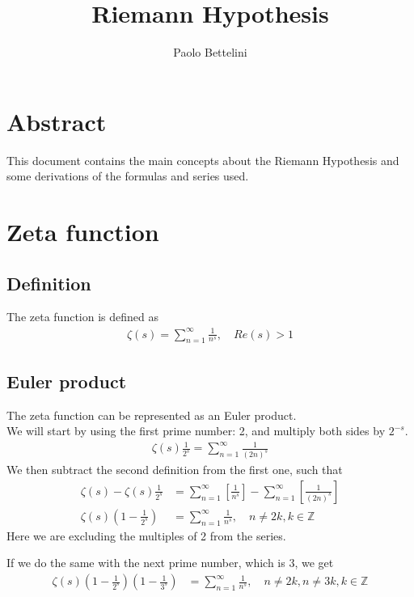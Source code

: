 \documentclass{article}
\title{Riemann Hypothesis}
\author{Paolo Bettelini}
\date{}
\begin{document}
\maketitle

\section*{Abstract}
This document contains the main concepts about the
Riemann Hypothesis and some derivations of the formulas and series used.

\pagebreak

\tableofcontents
\pagebreak

\section{Zeta function}

\subsection{Definition}
The zeta function is defined as
\begin{align*}
    \zeta(s)=\sum_{n=1}^{\infty}\frac{1}{n^s},\quad Re(s)>1
\end{align*}

\subsection{Euler product}
The zeta function can be represented as an Euler product.
\\
We will start by using the first prime number: 2, and multiply both sides by \(2^{-s}\).
\begin{align*}
    \zeta(s)\frac{1}{2^s}=\sum_{n=1}^{\infty}\frac{1}{{(2n)}^s}
\end{align*}
We then subtract the second definition from the first one, such that
\begin{align*}
    \zeta(s)-\zeta(s)\frac{1}{2^s}&=
    \sum_{n=1}^{\infty}\left[\frac{1}{n^s}\right]-
    \sum_{n=1}^{\infty}\left[\frac{1}{{(2n)}^s}\right]
    \\
    \zeta(s)\left(1-\frac{1}{2^s}\right)&=
    \sum_{n=1}^{\infty}\frac{1}{n^s},
    \quad n\neq 2k,k\in \mathbb{Z}
\end{align*}
Here we are excluding the multiples of 2 from the series.

If we do the same with the next prime number, which is 3, we get
\begin{align*}
    \zeta(s)\left(1-\frac{1}{2^s}\right)\left(1-\frac{1}{3^s}\right)&=
    \sum_{n=1}^{\infty}\frac{1}{n^s},
    \quad n\neq 2k,n\neq 3k, k\in \mathbb{Z}
\end{align*}
\end{document}
